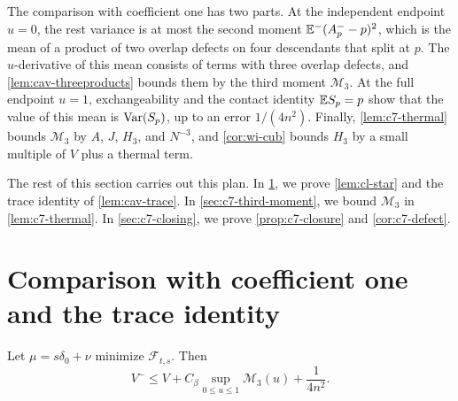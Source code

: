 The comparison with coefficient one has two parts. At the independent
endpoint $u=0$, the rest variance is at most the second moment
$\mathbb E^-(A^-_p-p)^2$, which is the mean of a product of two overlap defects
on four descendants that split at $p$. The $u$-derivative of this mean
consists of terms with three overlap defects, and
\cref{lem:cav-threeproducts} bounds them by the third moment
$\mathcal M_3$. At the full endpoint $u=1$, exchangeability and the
contact identity $\mathbb E S_p=p$ show that the value of this mean is
$\operatorname{Var}(S_p)$, up to an error $1/(4n^2)$. Finally, \cref{lem:c7-thermal}
bounds $\mathcal M_3$ by $A$, $J$, $H_3$, and $N^{-3}$, and
\cref{cor:wi-cub} bounds $H_3$ by a small multiple of $V$ plus a
thermal term.

The rest of this section carries out this plan. In
\cref{sec:c7-coefficient-one}, we prove \cref{lem:cl-star} and the
trace identity of \cref{lem:cav-trace}. In \cref{sec:c7-third-moment},
we bound $\mathcal M_3$ in \cref{lem:c7-thermal}. In
\cref{sec:c7-closing}, we prove \cref{prop:c7-closure} and
\cref{cor:c7-defect}.

\section{Comparison with coefficient one and the trace identity}
\label{sec:c7-coefficient-one}

\begin{lemma}\label{lem:cl-star}
Let $\mu=s\delta_0+\nu$ minimize $\mathcal F_{t,s}$. Then
\begin{equation}\label{eq:cl-star}
 V^-\le V+C_\beta\sup_{0\le u\le1}\mathcal M_3(u)+\frac1{4n^2}.
\end{equation}
\end{lemma}


